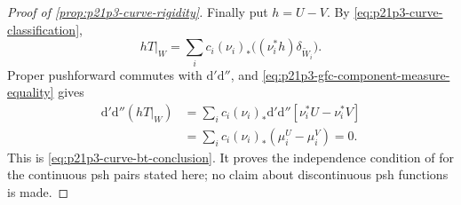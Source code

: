 \begin{proof}[Proof of \cref{prop:p21p3-curve-rigidity}]
Finally put $h=U-V$.  By
\eqref{eq:p21p3-curve-classification},
\[
 hT|_W=\sum_i c_i(\nu_i)_*
       \bigl((\nu_i^*h)\delta_{\widetilde W_i}\bigr).
\]
Proper pushforward commutes with $\mathrm d'\mathrm d''$, and
\eqref{eq:p21p3-gfc-component-measure-equality} gives
\begin{align*}
 \mathrm d'\mathrm d''(hT|_W)
 &=\sum_i c_i(\nu_i)_*
       \mathrm d'\mathrm d''[\nu_i^*U-\nu_i^*V] \\
 &=\sum_i c_i(\nu_i)_*(\mu_i^U-\mu_i^V)=0.
\end{align*}
This is \eqref{eq:p21p3-curve-bt-conclusion}.  It proves the
independence condition of \cite[Definition~8.6.2]{CLD25} for the
continuous psh pairs stated here; no claim about discontinuous psh
functions is made.
\end{proof}
